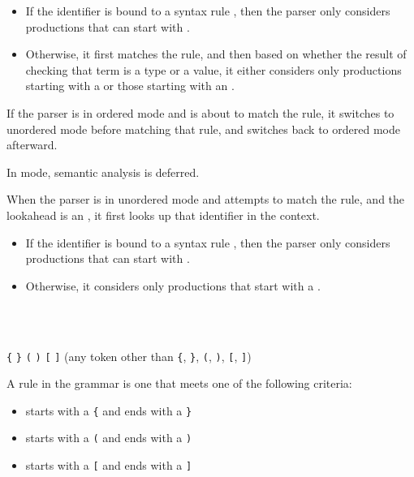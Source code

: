 \begin{itemize}
\item If the identifier is bound to a syntax rule , then the parser only considers productions that can start with .
\item Otherwise, it first matches the  rule, and then based on whether the result of checking that term is a type or a value, it either considers only productions starting with a  or those starting with an .
\end{itemize}

If the parser is in ordered mode and is about to match the  rule, it switches to unordered mode before matching that rule, and switches back to ordered mode afterward.


In  mode, semantic analysis is deferred.

When the parser is in unordered mode and attempts to match the  rule, and the lookahead is an , it first looks up that identifier in the context.

\begin{itemize}
\item If the identifier is bound to a syntax rule , then the parser only considers productions that can start with .
\item Otherwise, it considers only productions that start with a .
\end{itemize}
    
\begin{Syntax}
 \\
    \SynStar

 \\
    \lstinline|{|  \lstinline|}|
    \SynOr \lstinline|(|  \lstinline|)|
    \SynOr \lstinline|[|  \lstinline|]|
    \SynOr \SynComment(any token other than \lstinline|{|, \lstinline|}|, \lstinline|(|, \lstinline|)|, \lstinline|[|, \lstinline|]|)
\end{Syntax}

A  rule in the grammar is one that meets one of the following criteria:
\begin{itemize}
\item starts with a \lstinline|{| and ends with a \lstinline|}|
\item starts with a \lstinline|(| and ends with a \lstinline|)|
\item starts with a \lstinline|[| and ends with a \lstinline|]|
\end{itemize}

